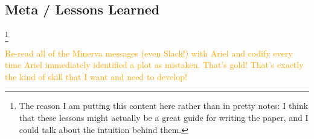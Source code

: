 \documentclass[11pt]{article}
\begin{document}
\begin{centering}
\section*{Meta / Lessons Learned}
\end{centering}

\footnote{The reason I am putting this content here rather than in pretty
notes: I think that these lessons might actually be a great guide for writing
the paper, and I could talk about the intuition behind them.
}

\textcolor{orange}{Re-read all of the Minerva messages (even Slack!) with
Ariel and codify every time Ariel immediately identified a plot as mistaken.
That's gold! That's exactly the kind of skill that I want and need to develop!}
\end{document}
